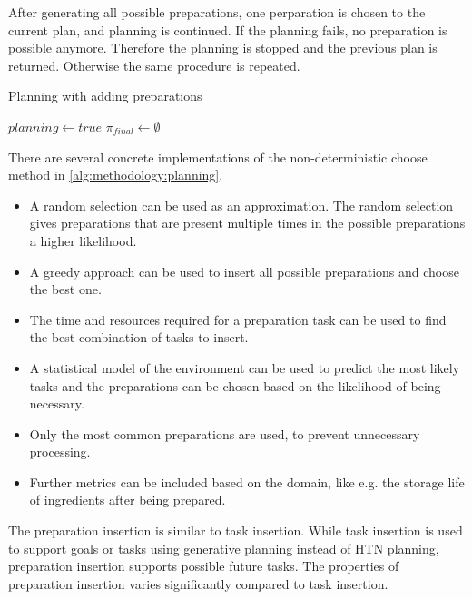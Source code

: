 After generating all possible preparations, one perparation is chosen to the current plan, and planning is continued.
If the planning fails, no preparation is possible anymore.
Therefore the planning is stopped and the previous plan is returned.
Otherwise the same procedure is repeated.

\begin{algorithm}
    \caption{Planning with adding preparations}
    \label{alg:methodology:planning}
    \KwOut{$\pi$}
    $planning \leftarrow true$\;
    $\pi_{final} \leftarrow \emptyset$\;
\end{algorithm}

There are several concrete implementations of the non-deterministic choose method in \ref{alg:methodology:planning}.

\begin{itemize}
  \item A random selection can be used as an approximation.
    The random selection gives preparations that are present multiple times in the possible preparations a higher likelihood.
  \item A greedy approach can be used to insert all possible preparations and choose the best one.
  \item The time and resources required for a preparation task can be used to find the best combination of tasks to insert.
  \item A statistical model of the environment can be used to predict the most likely tasks and the preparations can be chosen based on the likelihood of being necessary.
  \item Only the most common preparations are used, to prevent unnecessary processing.
  \item Further metrics can be included based on the domain, like e.g. the storage life of ingredients after being prepared.
\end{itemize}

The preparation insertion is similar to task insertion.
While task insertion is used to support goals or tasks using generative planning instead of HTN planning, preparation insertion supports possible future tasks.
The properties of preparation insertion varies significantly compared to task insertion.